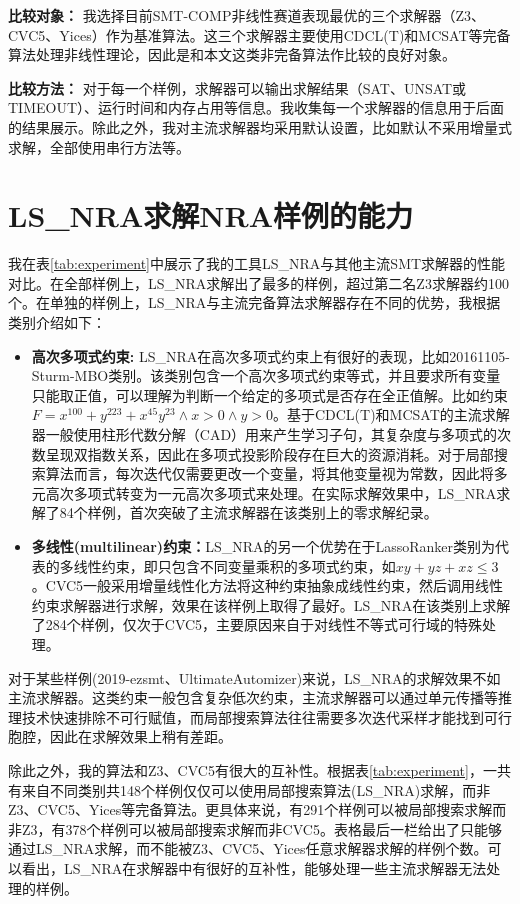  \textbf{比较对象：} 我选择目前SMT-COMP非线性赛道表现最优的三个求解器（Z3\cite{MouraB08}、CVC5\cite{BarbosaBBKLMMMN22}、Yices\cite{Dutertre14}）作为基准算法。这三个求解器主要使用CDCL(T)和MCSAT等完备算法处理非线性理论，因此是和本文这类非完备算法作比较的良好对象。

\textbf{比较方法：} 对于每一个样例，求解器可以输出求解结果（SAT、UNSAT或TIMEOUT）、运行时间和内存占用等信息。我收集每一个求解器的信息用于后面的结果展示。除此之外，我对主流求解器均采用默认设置，比如默认不采用增量式求解，全部使用串行方法等。

\section{LS\_NRA求解NRA样例的能力}
我在表\ref{tab:experiment}中展示了我的工具LS\_NRA与其他主流SMT求解器的性能对比。在全部样例上，LS\_NRA求解出了最多的样例，超过第二名Z3求解器约100个。在单独的样例上，LS\_NRA与主流完备算法求解器存在不同的优势，我根据类别介绍如下：
\begin{itemize}
    \item \textbf{高次多项式约束:} 
    LS\_NRA在高次多项式约束上有很好的表现，比如20161105-Sturm-MBO类别。该类别包含一个高次多项式约束等式，并且要求所有变量只能取正值，可以理解为判断一个给定的多项式是否存在全正值解。比如约束$F = x^100 + y^ 223 + x^45 y^23 \wedge x > 0 \wedge y > 0$。基于CDCL(T)和MCSAT的主流求解器一般使用柱形代数分解（CAD）用来产生学习子句，其复杂度与多项式的次数呈现双指数关系，因此在多项式投影阶段存在巨大的资源消耗。对于局部搜索算法而言，每次迭代仅需要更改一个变量，将其他变量视为常数，因此将多元高次多项式转变为一元高次多项式来处理。在实际求解效果中，LS\_NRA求解了84个样例，首次突破了主流求解器在该类别上的零求解纪录。

    \item \textbf{多线性(multilinear)约束：}LS\_NRA的另一个优势在于LassoRanker类别为代表的多线性约束，即只包含不同变量乘积的多项式约束，如$x y + y z + x z \leq 3$。CVC5一般采用增量线性化方法将这种约束抽象成线性约束，然后调用线性约束求解器进行求解，效果在该样例上取得了最好。LS\_NRA在该类别上求解了284个样例，仅次于CVC5，主要原因来自于对线性不等式可行域的特殊处理。
\end{itemize}

对于某些样例(2019-ezsmt、UltimateAutomizer)来说，LS\_NRA的求解效果不如主流求解器。这类约束一般包含复杂低次约束，主流求解器可以通过单元传播等推理技术快速排除不可行赋值，而局部搜索算法往往需要多次迭代采样才能找到可行胞腔，因此在求解效果上稍有差距。

除此之外，我的算法和Z3、CVC5有很大的互补性。根据表\ref{tab:experiment}，一共有来自不同类别共148个样例仅仅可以使用局部搜索算法(LS\_NRA)求解，而非Z3、CVC5、Yices等完备算法。更具体来说，有291个样例可以被局部搜索求解而非Z3，有378个样例可以被局部搜索求解而非CVC5。表格最后一栏给出了只能够通过LS\_NRA求解，而不能被Z3、CVC5、Yices任意求解器求解的样例个数。可以看出，LS\_NRA在求解器中有很好的互补性，能够处理一些主流求解器无法处理的样例。

